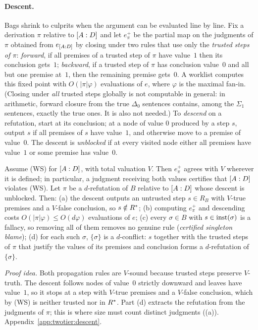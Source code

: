 \paragraph{Descent.} Bags shrink to culprits when the argument can be evaluated line by line. Fix a derivation $\pi$ relative to $[A : D]$ and let $e^+_\pi$ be the partial map on the judgments of $\pi$ obtained from $e_{[A : D]}$ by closing under two rules that use only the \emph{trusted steps of $\pi$}: \emph{forward}, if all premises of a trusted step of $\pi$ have value~$1$ then its conclusion gets~$1$; \emph{backward}, if a trusted step of $\pi$ has conclusion value~$0$ and all but one premise at~$1$, then the remaining premise gets~$0$. A worklist computes this fixed point with $O(|\pi|\varphi)$ evaluations of $e$, where $\varphi$ is the maximal fan-in. (Closing under \emph{all} trusted steps globally is not computable in general: in arithmetic, forward closure from the true $\Delta_0$ sentences contains, among the $\Sigma_1$ sentences, exactly the true ones. It is also not needed.) To \emph{descend} on a refutation, start at its conclusion; at a node of value $0$ produced by a step $s$, output $s$ if all premises of $s$ have value~$1$, and otherwise move to a premise of value~$0$. The descent is \emph{unblocked} if at every visited node either all premises have value~$1$ or some premise has value~$0$.

\begin{lemma}\label{lem:twotier:descent}
Assume (WS) for $[A : D]$, with total valuation $V$. Then $e^+_\pi$ agrees with $V$ wherever it is defined; in particular, a judgment receiving both values certifies that $[A : D]$ violates (WS). Let $\pi$ be a $d$-refutation of $B$ relative to $[A : D]$ whose descent is unblocked. Then:
\textup{(a)} the descent outputs an untrusted step $s\in R_B$ with $V$-true premises and a $V$-false conclusion, so $s\notin R^{*}$;
\textup{(b)} computing $e^+_\pi$ and descending costs $O(|\pi|\varphi)\le O(d\varphi)$ evaluations of $e$;
\textup{(c)} every $\sigma\in B$ with $s\in\mathrm{inst}(\sigma)$ is a fallacy, so removing all of them removes no genuine rule (\emph{certified singleton blame});
\textup{(d)} for each such $\sigma$, $\{\sigma\}$ is a $d$-conflict: $s$ together with the trusted steps of $\pi$ that justify the values of its premises and conclusion forms a $d$-refutation of $\{\sigma\}$.
\end{lemma}

\noindent\emph{Proof idea.} Both propagation rules are $V$-sound because trusted steps preserve $V$-truth. The descent follows nodes of value~$0$ strictly downward and leaves have value~$1$, so it stops at a step with $V$-true premises and a $V$-false conclusion, which by (WS) is neither trusted nor in $R^{*}$. Part (d) extracts the refutation from the judgments of $\pi$; this is where size must count distinct judgments ((a)). Appendix~\ref{app:twotier:descent}.

